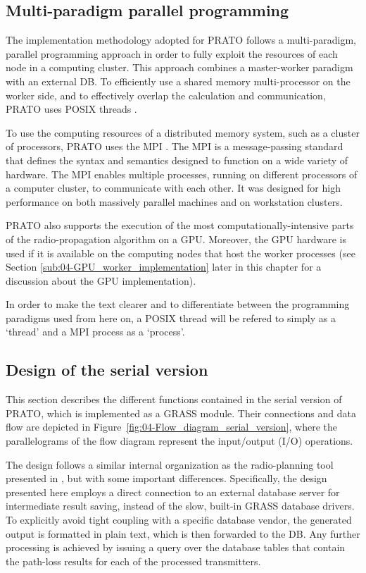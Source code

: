 \subsection{Multi-paradigm parallel programming}

The implementation methodology adopted for PRATO follows a multi-paradigm,
parallel programming approach in order to fully exploit the resources
of each node in a computing cluster. This approach combines a master-worker
paradigm with an external DB. To efficiently use a shared memory multi-processor
on the worker side, and to effectively overlap the calculation and
communication, PRATO uses POSIX threads \cite{Butenhof_Programming.with.POSIX.threads:1997}.

To use the computing resources of a distributed memory system, such
as a cluster of processors, PRATO uses the MPI \cite{Gropp_Using_MPI:1999}.
The MPI is a message-passing standard that defines the syntax and
semantics designed to function on a wide variety of hardware. The
MPI enables multiple processes, running on different processors of
a computer cluster, to communicate with each other. It was designed
for high performance on both massively parallel machines and on workstation
clusters.

PRATO also supports the execution of the most computationally-intensive
parts of the radio-propagation algorithm on a GPU. Moreover, the GPU
hardware is used if it is available on the computing nodes that host
the worker processes (see Section \ref{sub:04-GPU_worker_implementation}
later in this chapter for a discussion about the GPU implementation).

In order to make the text clearer and to differentiate between the
programming paradigms used from here on, a POSIX thread will be refered
to simply as a `thread' and a MPI process as a `process'.


\subsection{Design of the serial version}

This section describes the different functions contained in the serial
version of PRATO, which is implemented as a GRASS module. Their connections
and data flow are depicted in Figure~\ref{fig:04-Flow_diagram_serial_version},
where the parallelograms of the flow diagram represent the input/output
(I/O) operations. 

The design follows a similar internal organization as the radio-planning
tool presented in \cite{Ozimek_Open.source.radio.coverage.prediction:2010},
but with some important differences. Specifically, the design presented
here employs a direct connection to an external database server for
intermediate result saving, instead of the slow, built-in GRASS database
drivers. To explicitly avoid tight coupling with a specific database
vendor, the generated output is formatted in plain text, which is
then forwarded to the DB. Any further processing is achieved by issuing
a query over the database tables that contain the path-loss results
for each of the processed transmitters.


